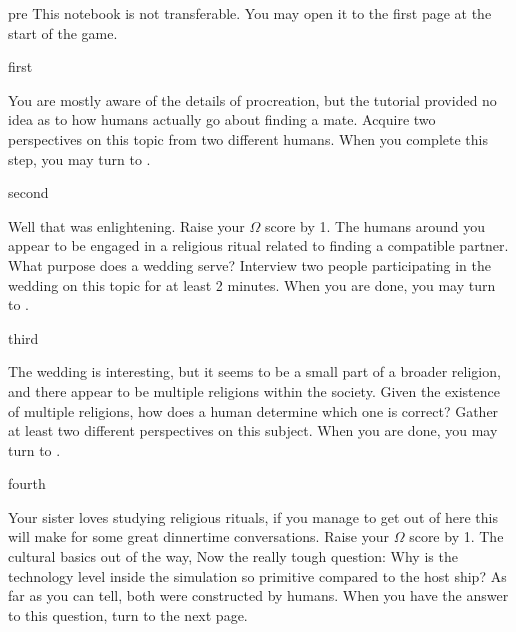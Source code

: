 \documentclass[notebook]{guildcamp1}
\begin{document}

\startnotebook{\nAlienQuestions{}}

\begin{page}{pre}
This notebook is not transferable. You may open it to the first page at the start of the game.
\end{page}

\begin{page}{first}

You are mostly aware of the details of procreation, but the tutorial provided no idea as to how humans actually go about finding a mate.
Acquire two perspectives on this topic from two different humans. When you complete this step, you may turn to .

\end{page}

\begin{page}{second}

Well that was enlightening. Raise your $\Omega$ score by 1. The humans around you appear to be engaged in a religious ritual related to
finding a compatible partner. What purpose does a wedding serve? Interview two people participating in the wedding on
this topic for at least 2 minutes. When you are done, you may turn to .

\end{page}

\begin{page}{third}

The wedding is interesting, but it seems to be a small part of a broader religion, and there appear to be multiple religions within the society.
Given the existence of multiple religions, how does a human determine which one is correct? Gather at least two different perspectives on this subject.
When you are done, you may turn to .

\end{page}

\begin{page}{fourth}

Your sister loves studying religious rituals, if you manage to get out of here this will make for some great dinnertime conversations.
Raise your $\Omega$ score by 1. The cultural basics out of the way, Now the really tough question: 
Why is the technology level inside the simulation so primitive compared to the host ship? As far as you can tell, both were constructed by humans.
When you have the answer to this question, turn to the next page.

\end{page}
\end{document}
